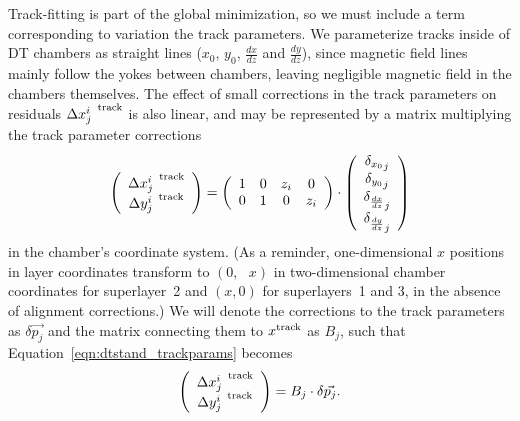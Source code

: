 Track-fitting is part of the global minimization, so we must include a
term corresponding to variation the track parameters.  We parameterize
tracks inside of DT chambers as straight lines ($x_0$, $y_0$,
$\frac{dx}{dz}$ and $\frac{dy}{dz}$), since magnetic field lines
mainly follow the yokes between chambers, leaving negligible magnetic
field in the chambers themselves.  The effect of small corrections in
the track parameters on residuals ${\Delta
x^i_j}^{\mbox{\scriptsize \, track}}$ is also linear, and may be
represented by a matrix multiplying the track parameter corrections
\begin{equation}
\left(\begin{array}{c}
{\Delta x^i_j}^{\mbox{\scriptsize \, track}} \\
{\Delta y^i_j}^{\mbox{\scriptsize \, track}} \\
\end{array}\right) =
\left(\begin{array}{c c c c}
1 & 0 & z_i & 0 \\
0 & 1 & 0 & z_i \\
\end{array}\right)\cdot
\left(\begin{array}{c}
{\delta_{x_0}}_j \\
{\delta_{y_0}}_j \\
{\delta_{\frac{dx}{dz}}}_j \\
{\delta_{\frac{dy}{dz}}}_j \\
\end{array}\right)
\label{eqn:dtstand_trackparams}
\end{equation}
in the chamber's coordinate system.  (As a reminder, one-dimensional
$x$ positions in layer coordinates transform to $(0,\mbox{ }x)$ in
two-dimensional chamber coordinates for superlayer~2 and $(x,\mbox{
}0)$ for superlayers~1 and 3, in the absence of alignment
corrections.)  We will denote the corrections to the track parameters
as $\delta \vec{p_j}$ and the matrix connecting them to
$x^{\mbox{\scriptsize track}}$ as $B_j$, such that
Equation~\ref{eqn:dtstand_trackparams} becomes
\begin{equation}
\left(\begin{array}{c}
{\Delta x^i_j}^{\mbox{\scriptsize \, track}} \\
{\Delta y^i_j}^{\mbox{\scriptsize \, track}} \\
\end{array}\right) = B_j \cdot \delta \vec{p_j} \mbox{.}
\end{equation}

